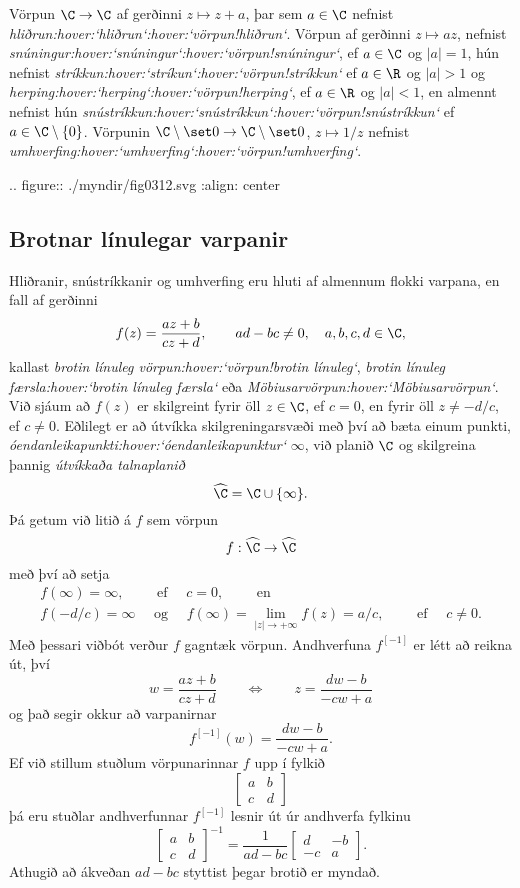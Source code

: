 Vörpun $\C\to \C$ af gerðinni $z\mapsto z+a$, þar sem 
$a\in \C$ nefnist {\it hliðrun:hover:`hliðrun`:hover:`vörpun!hliðrun`}.
Vörpun af gerðinni $z\mapsto az$, nefnist
{\it snúningur:hover:`snúningur`:hover:`vörpun!snúningur`}, ef $a\in
\C$ og  $|a|=1$, hún nefnist {\it
stríkkun:hover:`stríkun`:hover:`vörpun!stríkkun`} ef $a\in
\R$ og $|a|>1$ og {\it herping:hover:`herping`:hover:`vörpun!herping`}, ef  
$a\in \R$ og $|a|<1$, en almennt nefnist hún
{\it snústríkkun:hover:`snústríkkun`:hover:`vörpun!snústríkkun`} ef $a\in \C\setminus\{0\}$.
Vörpunin $\C\setminus\set 0 \to \C\setminus\set 0$, 
$z\mapsto 1/z$ nefnist {\it
umhverfing:hover:`umhverfing`:hover:`vörpun!umhverfing`}.

\bigskip
.. figure:: ./myndir/fig0312.svg
    :align: center

    




\subsection*{Brotnar línulegar varpanir}

Hliðranir, snústríkkanir og umhverfing eru hluti af almennum flokki
varpana, en fall af gerðinni 
 $$f(z)=\dfrac{az+b}{cz+d}, \qquad ad-bc\neq 0, \quad a,b,c,d\in \C,
 $$
kallast {\it brotin línuleg vörpun:hover:`vörpun!brotin línuleg`},
{\it brotin línuleg færsla:hover:`brotin línuleg færsla`}
eða {\it Möbiusarvörpun:hover:`Möbiusarvörpun`}.  Við
sjáum að $f(z)$  er skilgreint fyrir öll $z\in \C$,  ef $c=0$, en fyrir
öll $z\neq -d/c$, ef $c\neq 0$.  
Eðlilegt er að útvíkka
skilgreningarsvæði með því að bæta einum punkti, {\it
óendanleikapunkti:hover:`óendanleikapunktur`}   $\infty$, 
við planið $\C$ og skilgreina þannig {\it útvíkkaða talnaplanið}
$$
\widehat \C=\C\cup \{\infty\}.
$$
Þá getum við litið á $f$ sem vörpun
 $$f:\widehat \C \to \widehat \C
 $$
með því að setja
\begin{gather*}
f(\infty)=\infty, \qquad \text{ ef } \quad c=0, \qquad \text{ en }\\
f(-d/c)=\infty \quad \text{ og } \quad f(\infty)=\lim_{|z|\to+\infty}f(z)=a/c, \qquad
\text{ ef } \quad c\neq 0.
\end{gather*}
Með þessari viðbót verður $f$ gagntæk vörpun.  
Andhverfuna $f^{[-1]}$ er létt að
reikna út, því
 $$w=\dfrac{az+b}{cz+d} \qquad \Leftrightarrow \qquad
z=\dfrac{dw-b}{-cw+a}
 $$
og það  segir okkur að varpanirnar 
$$
f^{[-1]}(w)=\dfrac{dw-b}{-cw+a}.
$$
Ef við stillum stuðlum vörpunarinnar $f$ upp í fylkið
$$
\left[\begin{matrix} a&b\\c&d\end{matrix}\right]
$$
þá eru stuðlar andhverfunnar $f^{[-1]}$ lesnir út úr andhverfa fylkinu 
 $$\left[\begin{matrix} a&b\\c&d\end{matrix}\right]^{-1}=
\dfrac 1{ad-bc}\left[\begin{matrix} d&-b\\-c&a\end{matrix}\right].
 $$
Athugið að ákveðan $ad-bc$ styttist þegar brotið er myndað.

